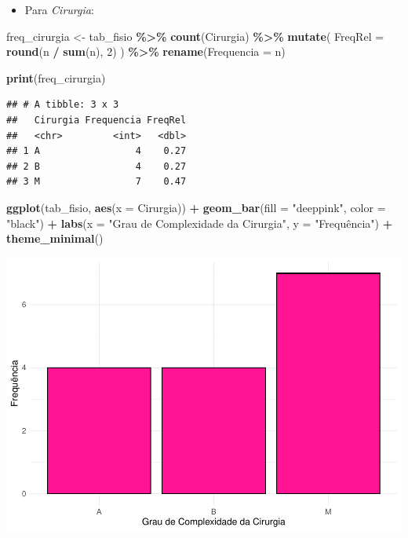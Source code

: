 \documentclass[
]{book}
\newenvironment{Shaded}{\begin{snugshade}}{\end{snugshade}}
\newcommand{\AttributeTok}[1]{\textcolor[rgb]{0.13,0.29,0.53}{#1}}
\newcommand{\DecValTok}[1]{\textcolor[rgb]{0.00,0.00,0.81}{#1}}
\newcommand{\FunctionTok}[1]{\textcolor[rgb]{0.13,0.29,0.53}{\textbf{#1}}}
\newcommand{\NormalTok}[1]{#1}
\newcommand{\OtherTok}[1]{\textcolor[rgb]{0.56,0.35,0.01}{#1}}
\newcommand{\SpecialCharTok}[1]{\textcolor[rgb]{0.81,0.36,0.00}{\textbf{#1}}}
\newcommand{\StringTok}[1]{\textcolor[rgb]{0.31,0.60,0.02}{#1}}
\providecommand{\tightlist}{%
  \setlength{\itemsep}{0pt}\setlength{\parskip}{0pt}}
\begin{document}
\begin{itemize}
\tightlist
\item
  Para \emph{Cirurgia}:
\end{itemize}

\begin{Shaded}
\begin{Highlighting}[]
\NormalTok{freq\_cirurgia }\OtherTok{\textless{}{-}}\NormalTok{ tab\_fisio }\SpecialCharTok{\%\textgreater{}\%}
  \FunctionTok{count}\NormalTok{(Cirurgia) }\SpecialCharTok{\%\textgreater{}\%}
  \FunctionTok{mutate}\NormalTok{(}
    \AttributeTok{FreqRel =} \FunctionTok{round}\NormalTok{(n }\SpecialCharTok{/} \FunctionTok{sum}\NormalTok{(n), }\DecValTok{2}\NormalTok{)}
\NormalTok{  ) }\SpecialCharTok{\%\textgreater{}\%}
  \FunctionTok{rename}\NormalTok{(}\AttributeTok{Frequencia =}\NormalTok{ n)}

\FunctionTok{print}\NormalTok{(freq\_cirurgia)}
\end{Highlighting}
\end{Shaded}

\begin{verbatim}
## # A tibble: 3 x 3
##   Cirurgia Frequencia FreqRel
##   <chr>         <int>   <dbl>
## 1 A                 4    0.27
## 2 B                 4    0.27
## 3 M                 7    0.47
\end{verbatim}

\begin{Shaded}
\begin{Highlighting}[]
\FunctionTok{ggplot}\NormalTok{(tab\_fisio, }\FunctionTok{aes}\NormalTok{(}\AttributeTok{x =}\NormalTok{ Cirurgia)) }\SpecialCharTok{+}
  \FunctionTok{geom\_bar}\NormalTok{(}\AttributeTok{fill =} \StringTok{"deeppink"}\NormalTok{, }\AttributeTok{color =} \StringTok{"black"}\NormalTok{) }\SpecialCharTok{+}
  \FunctionTok{labs}\NormalTok{(}\AttributeTok{x =} \StringTok{"Grau de Complexidade da Cirurgia"}\NormalTok{, }\AttributeTok{y =} \StringTok{"Frequência"}\NormalTok{) }\SpecialCharTok{+}
  \FunctionTok{theme\_minimal}\NormalTok{()}
\end{Highlighting}
\end{Shaded}

\begin{center}\includegraphics{AED_files/figure-latex/cap6_ex1bc-1} \end{center}
\end{document}
